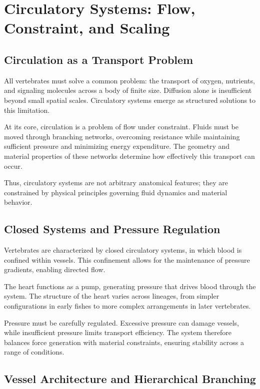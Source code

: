 \documentclass[11pt,oneside]{book}
\begin{document}
\chapter{Circulatory Systems: Flow, Constraint, and Scaling}

\section{Circulation as a Transport Problem}

All vertebrates must solve a common problem: the transport of oxygen, nutrients, and signaling molecules across a body of finite size. Diffusion alone is insufficient beyond small spatial scales. Circulatory systems emerge as structured solutions to this limitation.

At its core, circulation is a problem of flow under constraint. Fluids must be moved through branching networks, overcoming resistance while maintaining sufficient pressure and minimizing energy expenditure. The geometry and material properties of these networks determine how effectively this transport can occur.

Thus, circulatory systems are not arbitrary anatomical features; they are constrained by physical principles governing fluid dynamics and material behavior.

\section{Closed Systems and Pressure Regulation}

Vertebrates are characterized by closed circulatory systems, in which blood is confined within vessels. This confinement allows for the maintenance of pressure gradients, enabling directed flow.

The heart functions as a pump, generating pressure that drives blood through the system. The structure of the heart varies across lineages, from simpler configurations in early fishes to more complex arrangements in later vertebrates.

Pressure must be carefully regulated. Excessive pressure can damage vessels, while insufficient pressure limits transport efficiency. The system therefore balances force generation with material constraints, ensuring stability across a range of conditions.

\section{Vessel Architecture and Hierarchical Branching}
\end{document}

